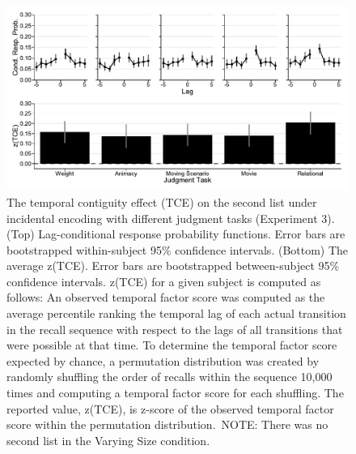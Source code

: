 \documentclass[man,natbib,floatsintext]{apa6} %
\begin{document}
\begin{figure}%
\includegraphics{figures/E3_crp_list2.pdf}
\caption{The temporal contiguity effect (TCE) on the second list under incidental encoding with different judgment tasks (Experiment 3). (Top) Lag-conditional response probability functions. Error bars are bootstrapped within-subject 95\% confidence intervals. (Bottom) The average z(TCE).  Error bars are bootstrapped between-subject 95\% confidence intervals. z(TCE) for a given subject is computed as follows: An observed temporal factor score was computed as the average percentile ranking the temporal lag of each actual transition in the recall sequence with respect to the lags of all transitions that were possible at that time. To determine the temporal factor score expected by chance, a permutation distribution was created by randomly shuffling the order of recalls within the sequence 10,000 times and computing a temporal factor score for each shuffling. The reported value, z(TCE), is z-score of the observed temporal factor score within the permutation distribution.~NOTE: There was no second list in the Varying Size condition.}
\label{e3_l2_crp}
\end{figure}


\end{document}

